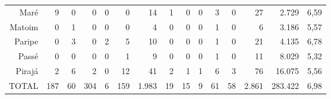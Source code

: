 \begin{landscape}
\begin{table}[!htp]
{\begin{tiny}
\begin{tabular}{rrrrrrrrrrrrrrr}
Maré	&9	&0	&0	&0	&0	&14	&1	&0	&0	&3	&0	&27	&2.729	&6,59 \\
Matoim	&0	&1	&0	&0	&0	&4	&0	&0	&0	&1	&0	&6	&3.186	&5,57 \\
Paripe	&0	&3	&0	&2	&5	&10	&0	&0	&0	&1	&0	&21	&4.135	&6,78 \\
Passé	&0	&0	&0	&0	&1	&9	&0	&0	&0	&1	&0	&11	&8.029	&5,32 \\
Pirajá	&2	&6	&2	&0	&12	&41	&2	&1	&1	&6	&3	&76	&16.075	&5,56 \\
\hline
TOTAL	&187	&60	&304	&6	&159	&1.983	&19	&15	&9	&61	&58	&2.861	&283.422	&6,98 \\
\hline
\end{tabular} 
\end{tiny}
}
{}
\end{table}
\end{landscape}	